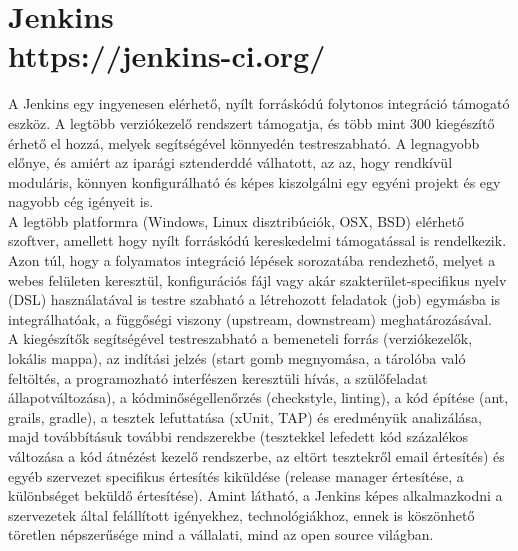 \section{Jenkins\\\small{https://jenkins-ci.org/}}
A Jenkins egy ingyenesen elérhető, nyílt forráskódú folytonos integráció támogató eszköz. A legtöbb verziókezelő rendszert támogatja, és több mint 300 kiegészítő érhető el hozzá, melyek segítségével könnyedén testreszabható. A legnagyobb előnye, és amiért az iparági sztenderddé válhatott, az az, hogy rendkívül moduláris, könnyen konfigurálható és képes kiszolgálni egy egyéni projekt és egy nagyobb cég igényeit is.\hfill\\
A legtöbb platformra (Windows, Linux disztribúciók, OSX, BSD) elérhető szoftver, amellett hogy nyílt forráskódú kereskedelmi támogatással is rendelkezik.\hfill\\
Azon túl, hogy a folyamatos integráció lépések sorozatába rendezhető, melyet a webes felületen keresztül, konfigurációs fájl vagy akár szakterület-specifikus nyelv (DSL) használatával is testre szabható a létrehozott feladatok (job) egymásba is integrálhatóak, a függőségi viszony (upstream, downstream) meghatározásával.\hfill\\
A kiegészítők segítségével testreszabható a bemeneteli forrás (verziókezelők, lokális mappa), az indítási jelzés (start gomb megnyomása, a tárolóba való feltöltés, a programozható interfészen keresztüli hívás, a szülőfeladat állapotváltozása), a kódminőségellenőrzés (checkstyle, linting), a kód építése (ant, grails, gradle), a tesztek lefuttatása (xUnit, TAP) és eredményük analizálása, majd továbbításuk további rendszerekbe (tesztekkel lefedett kód százalékos változása a kód átnézést kezelő rendszerbe, az eltört tesztekről email értesítés) és egyéb szervezet specifikus értesítés kiküldése (release manager értesítése, a különbséget beküldő értesítése).
Amint látható, a Jenkins képes alkalmazkodni a szervezetek által felállított igényekhez, technológiákhoz, ennek is köszönhető töretlen népszerűsége mind a vállalati, mind az open source világban.

